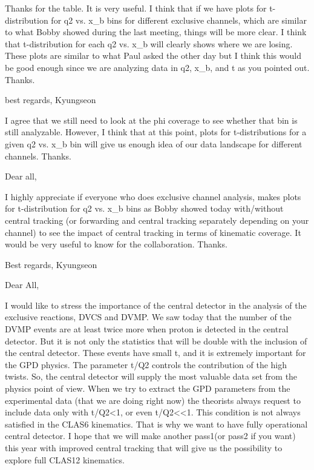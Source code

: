 Thanks for the table.  It is very useful.  I think that if we have plots for t-distribution for q2 vs. x_b bins for different exclusive channels, which are similar to what Bobby showed during the last meeting, things will be more clear.      I think that  t-distribution for each q2 vs. x_b will clearly shows where we are losing.  These plots are similar to what Paul asked the other day but I think this would be good enough since we are analyzing data in q2, x_b, and t as you pointed out.   Thanks.

best regards, Kyungseon

I agree that we still need to look at the phi coverage to see whether that bin is still analyzable.  However, I think that at this point, plots for t-distributions for a given q2 vs. x_b bin will give us enough idea of our data landscape for different channels.  Thanks.


Dear all,

I highly appreciate if everyone who does exclusive channel analysis, makes plots for t-distribution for q2 vs. x_b bins as Bobby showed today with/without central tracking (or forwarding and central tracking separately depending on your channel) to see the impact of central tracking in terms of kinematic coverage.  It would be very useful to know for the collaboration.   Thanks.

Best regards, Kyungseon


Dear All,

I would like to stress the importance of the central detector in the analysis of the exclusive reactions, DVCS and DVMP. We saw today that the number of the DVMP events are at least twice  more when  proton is detected in the central detector.  But it is not only the statistics that will be double with the inclusion of the central detector. These events have small t, and it is extremely important for the GPD physics. The parameter t/Q2 controls the contribution of  the high twists. So, the central detector will supply the most valuable data set from the physics point of view. When we try to extract the GPD parameters from the experimental data (that we are doing right now) the theorists always request to include data only with t/Q2<1, or even t/Q2<<1. This condition is not always satisfied in the CLAS6 kinematics. That is why we want to have fully operational central detector. I hope that we will make another pass1(or pass2 if you want) this year with improved central tracking that will give us the possibility to explore full CLAS12 kinematics.


